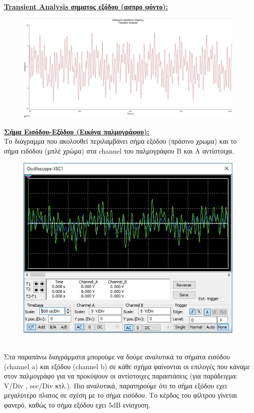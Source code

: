 \documentclass{article}
\begin{document}
{{\begin{figure}[h!]
\end{figure} \\
\textbf{\underline{Transient Analysis σηματος εξόδου (ασπρο φόντο):}}
\begin{figure}[h!]
\centering
 	\advance\leftskip-1cm
  \includegraphics[width=120mm,scale=2]{thema3/multisim9.jpg}
\end{figure} 
 \clearpage
 \textbf{\underline{Σήμα Εισόδου-Εξόδου (Εικόνα παλμογράφου):}} 
 \\[1.4\baselineskip]
 Το διάγραμμα που ακολουθεί περιλαμβάνει  σήμα εξόδου (πράσινο χρωμα) και το σήμα ειδόδου (μπλέ χρώμα) στα channel του παλμογράφου B και A αντίστοιχα.  \\[0.4\baselineskip]
 \begin{figure}[h!]
\centering
 	\advance\leftskip-0.7cm
  \includegraphics[width=130mm,scale=2]{thema3/multisim10.jpg}
\end{figure}   \\[1.4\baselineskip]
Στα παραπάνω διαγράμματα μπορούμε να δούμε αναλυτικά τα σήματα εισόδου (channel a) και εξόδου (channel b) σε κάθε σχήμα φαίνονται οι επιλογές που κάναμε στον παλμογράφο για να προκύψουν οι αντίστοιχες παραστάσεις (για παράδειγμα: V/Div ,  sec/Div κτλ.).
Πιο αναλυτικά, παρατηρούμε ότι το σήμα εξόδου εχει μεγαλύτερο πλατος σε σχέση με το σήμα εισόδου. Το κέρδος του φίλτρου γίνεται φανερό, καθώς το σήμα εξόδου εχει 5dB ενίσχυση. 
\clearpage
}}
\end{document}
